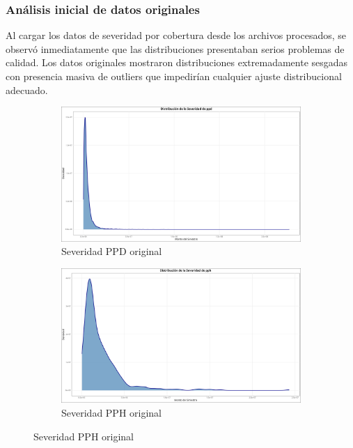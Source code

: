 \subsubsection{Análisis inicial de datos originales}

Al cargar los datos de severidad por cobertura desde los archivos procesados, se observó inmediatamente que las distribuciones presentaban serios problemas de calidad. Los datos originales mostraron distribuciones extremadamente sesgadas con presencia masiva de outliers que impedirían cualquier ajuste distribucional adecuado.

\begin{figure}[H]
    \centering
    \begin{subfigure}{0.35\textwidth}
        \includegraphics[width=\textwidth]{../images/distribucion_severidad_ppd.png}
        \caption{Severidad PPD original}
    \end{subfigure}
    \hfill
    \begin{subfigure}{0.35\textwidth}
        \includegraphics[width=\textwidth]{../images/distribucion_severidad_pph.png}
        \caption{Severidad PPH original}

\end{subfigure}
\end{figure}
